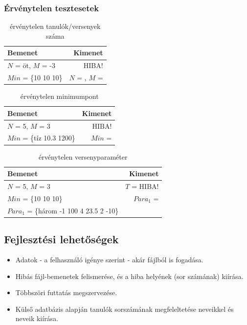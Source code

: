 \documentclass[a4paper]{article}
\begin{document}
      \subsubsection{Érvénytelen tesztesetek}
      \begin{table}[H]
        \caption*{érvénytelen tanulók/versenyek száma}
        \begin{tabular*}{\textwidth}{lr}
          \toprule
          Bemenet & Kimenet \\
          \midrule
          $N$ = öt, $M$ = -3 & HIBA! \\
          $Min$ = \{10 10 10\} & $N$ = , $M$ =  \\
          \bottomrule
        \end{tabular*}
      \end{table}
      \begin{table}[H]
        \caption*{érvénytelen minimumpont}
        \begin{tabular*}{\textwidth}{lr}
          \toprule
          Bemenet & Kimenet \\
          \midrule
          $N$ = 5, $M$ = 3 & HIBA! \\
          $Min$ = \{tíz 10.3 1200\} & $Min$ = \\
          \bottomrule
        \end{tabular*}
      \end{table}
      \begin{table}[H]
        \caption*{érvénytelen versenyparaméter}
        \begin{tabular*}{\textwidth}{lr}
          \toprule
          Bemenet & Kimenet \\
          \midrule
          $N$ = 5, $M$ = 3 & $T$ = HIBA! \\
          $Min$ = \{10 10 10\} & $Para_1$ = \\
          $Para_1$ = \{három -1 100 4 23.5 2 -10\} \\
          \bottomrule
        \end{tabular*}
      \end{table}
    \subsection{Fejlesztési lehetőségek}
      \begin{itemize}
        \item Adatok - a felhasználó igénye szerint - akár fájlból is fogadása.
        \item Hibás fájl-bemenetek felismerése, és a hiba helyének (sor számának) kiírása.
        \item Többszöri futtatás megszervezése.
        \item Külső adatbázis alapján tanulók sorszámának megfeleltetése neveikkel és neveik kiírása.
      \end{itemize}
\end{document}
